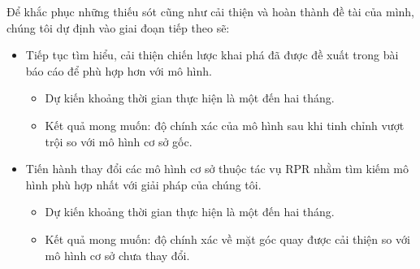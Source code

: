 Để khắc phục những thiếu sót cũng như cải thiện và hoàn thành đề tài của mình, chúng tôi dự định vào giai đoạn tiếp theo sẽ:
\begin{itemize}
	\item Tiếp tục tìm hiểu, cải thiện chiến lược khai phá đã được đề xuất trong bài báo cáo để phù hợp hơn với mô hình.
	      \begin{itemize}
		      \item Dự kiến khoảng thời gian thực hiện là một đến hai tháng.
		      \item Kết quả mong muốn: độ chính xác của mô hình sau khi tinh chỉnh vượt trội so với mô hình cơ sở gốc.
	      \end{itemize}
	\item Tiến hành thay đổi các mô hình cơ sở thuộc tác vụ RPR nhằm tìm kiếm mô hình phù hợp nhất với giải pháp của chúng tôi.
		\begin{itemize}
	 		  \item Dự kiến khoảng thời gian thực hiện là một đến hai tháng.
		      \item Kết quả mong muốn: độ chính xác về mặt góc quay được cải thiện so với mô hình cơ sở chưa thay đổi.
		\end{itemize}
\end{itemize}
